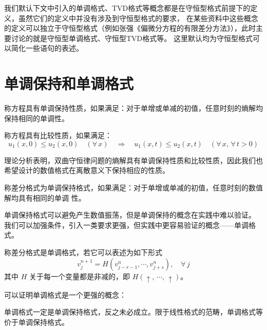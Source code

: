 \begin{remark}
    我们默认下文中引入的单调格式、TVD格式等概念都是在守恒型格式前提下的定义，虽然它们的定义中并没有涉及到守恒型格式的要求，
    在某些资料中这些概念的定义可以独立于守恒型格式（例如张强《偏微分方程的有限差分方法》），此时主要讨论的就是守恒型单调格式、守恒型TVD格式等。
    这里默认均为守恒型格式可以简化一些语句的表述。
\end{remark}

\section{单调保持和单调格式}

\begin{definition}
    称方程具有单调保持性质，如果满足：对于单增或单减的初值，任意时刻的熵解均保持相同的单调性。
\end{definition}

\begin{definition}
    称方程具有比较性质，如果满足：
    \[
        u_1(x,0) \le u_2(x,0)\quad(\forall\, x) \quad \Rightarrow \quad
        u_1(x,t) \le u_2(x,t)\quad(\forall\, x,\,\forall\,t > 0)
    \]
\end{definition}

理论分析表明，双曲守恒律问题的熵解具有单调保持性质和比较性质，因此我们也希望设计的数值格式在离散意义下保持相应的性质。

\begin{definition}[单调保持格式]
    称差分格式为单调保持格式，如果满足：对于单增或单减的初值，任意时刻的数值解均具有相同的单调
    性。
\end{definition}

单调保持格式可以避免产生数值振荡，但是单调保持的概念在实践中难以验证。
我们可以加强条件，引入一类要求更强，但实践中更容易验证的概念——单调格式。

\begin{definition}[单调格式]
    称差分格式是单调格式，若它可以表述为如下形式
    \[
        v_j^{n+1} = H(v_{j-r-1}^n,\cdots,v_{j+s}^n),\quad \forall\,j
    \]
    其中 $H$ 关于每一个变量都是非减的，即 $H(\uparrow,\,\cdots,\,\uparrow)$。
\end{definition}


可以证明单调格式是一个更强的概念：

\begin{theorem}
    单调格式一定是单调保持格式，反之未必成立。限于线性格式的范畴，单调格式等价于单调保持格式。
\end{theorem}

